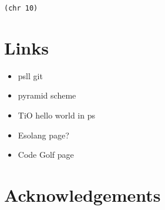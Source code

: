 \documentclass[aip,jcp,reprint]{revtex4-1}
\newcommand{\ilpsll}[1]{\lstinline[language=psll,columns=flexible]{#1}}
\begin{document}
\lipsum[11-15]
\ilpsll{(chr 10)}
\section*{Links}

\begin{itemize}
\item psll git
\item pyramid scheme
\item TiO hello world in ps
\item Esolang page?
\item Code Golf page
\end{itemize}

\section*{Acknowledgements}
 
\nocite{*}

\end{document}
